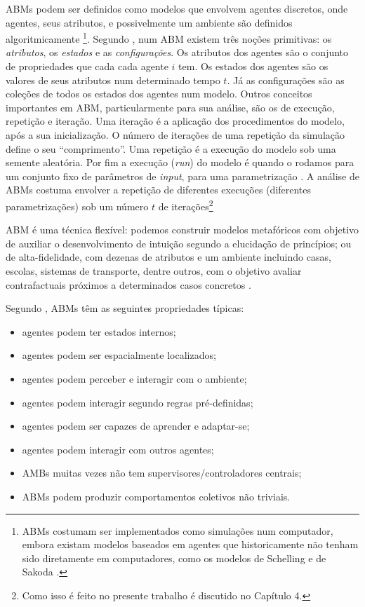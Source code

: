 ABMs podem ser definidos como modelos que envolvem agentes discretos, onde
agentes, seus atributos, e possivelmente um ambiente são definidos
algoritmicamente \cite{sayama2015introduction} \footnote{ ABMs costumam ser
  implementados como simulações num computador, embora existam modelos baseados
  em agentes que historicamente não tenham sido diretamente em computadores,
  como os modelos de Schelling e de Sakoda \cite{hegselmann2017thomas}.}.
Segundo , num ABM existem três noções primitivas: os
\textit{atributos}, os \textit{estados} e as \textit{configurações}. Os
atributos dos agentes são o conjunto de propriedades que cada cada agente \(i\)
tem. Os estados dos agentes são os valores de seus atributos num determinado
tempo \(t\). Já as configurações são as coleções de todos os estados dos agentes
num modelo. Outros conceitos importantes em ABM, particularmente para sua
análise, são os de execução, repetição e iteração. Uma iteração é a aplicação
dos procedimentos do modelo, após a sua inicialização. O número de iterações de
uma repetição da simulação define o seu ``comprimento''. Uma repetição é a
execução do modelo sob uma semente aleatória. Por fim a execução (\textit{run})
do modelo é quando o rodamos para um conjunto fixo de parâmetros de
\textit{input}, para uma parametrização \cite{laver2011party}. A análise de ABMs
costuma envolver a repetição de diferentes execuções (diferentes
parametrizações) sob um número \(t\) de iterações\footnote{Como isso é feito no
  presente trabalho é discutido no Capítulo 4.}

ABM é uma técnica flexível: podemos construir modelos metafóricos com
objetivo de auxiliar o desenvolvimento de intuição segundo a elucidação de
princípios; ou de alta-fidelidade, com dezenas de atributos e um
ambiente incluindo casas, escolas, sistemas de transporte, dentre outros, com o
objetivo avaliar contrafactuais próximos a determinados casos concretos
\cite{de2014agent, epstein2006generative}.


Segundo , ABMs têm as seguintes
propriedades típicas:
\begin{itemize}
\item agentes podem ter estados internos;
\item agentes podem ser espacialmente localizados;
\item agentes podem perceber e interagir com o ambiente;
\item agentes podem interagir segundo regras pré-definidas;
\item agentes podem ser capazes de aprender e adaptar-se;
\item agentes podem interagir com outros agentes;
\item AMBs muitas vezes não tem supervisores/controladores centrais;
  \item ABMs podem produzir comportamentos coletivos não triviais.
  \end{itemize}

